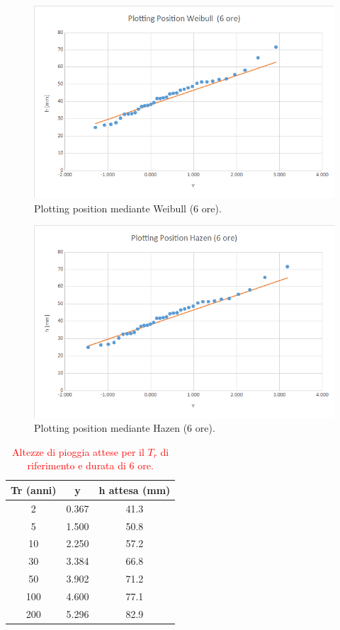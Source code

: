 \begin{figure}[H]\centering
        \includegraphics[scale=.5]{immagini/plot_pos_weib_6ore.png}
        \caption{Plotting position mediante Weibull (6 ore).}
      \label{plot_pos_weib_6ore}
 \end{figure}

\begin{figure}[H]\centering
        \includegraphics[scale=.5]{immagini/plot_pos_hazen_6ore.png}
        \caption{Plotting position mediante Hazen (6 ore).}
      \label{plot_pos_hazen_6ore}
\end{figure}

\begin{table}[H] \centering
    \caption{\textcolor{red}{Altezze di pioggia attese per il $T_r$ di riferimento e durata di 6 ore.}}
        \begin{tabular}{ccc}
        \toprule
        Tr (anni) & y     & h attesa (mm) \\
        \midrule
        2 & 0.367 & 41.3  \\
        5 & 1.500 & 50.8  \\
        10  & 2.250 & 57.2          \\
        30  & 3.384 & 66.8          \\
        50  & 3.902 & 71.2          \\
        100 & 4.600 & 77.1          \\
        200 & 5.296 & 82.9          \\         
        \bottomrule
        \end{tabular}
\end{table}

